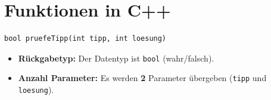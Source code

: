 \documentclass{scrartcl}
\begin{document}
\inputminted[breaklines, linenos, bgcolor=gray!10]{cpp}{zahlen-raten.cpp}

\section{Funktionen in C++}

\begin{verbatim}
bool pruefeTipp(int tipp, int loesung)
\end{verbatim}

\begin{itemize}
  \item \textbf{Rückgabetyp:} Der Datentyp ist \texttt{bool} (wahr/falsch).
  \item \textbf{Anzahl Parameter:} Es werden \textbf{2} Parameter übergeben (\texttt{tipp} und \texttt{loesung}).
\end{itemize}

\inputminted[breaklines, linenos, bgcolor=gray!10]{cpp}{funktionen.cpp}

%

%
%

\end{document}
